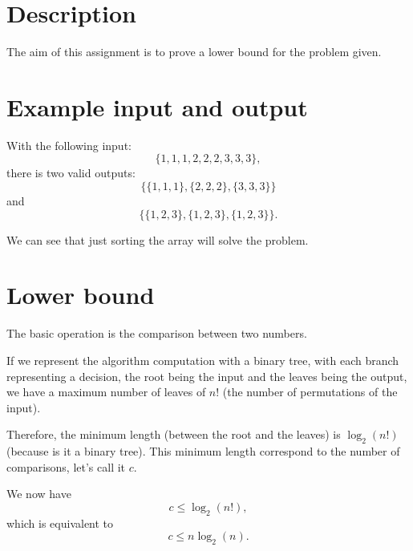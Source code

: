 \section{Description}
    The aim of this assignment is to prove a lower bound for the problem given.

\section{Example input and output} 
    With the following input: \[ \{1,1,1,2,2,2,3,3,3\} ,\] there is two valid outputs: \[ \{\{1,1,1\},\{2,2,2\},\{3,3,3\}\}\] and \[ \{\{1,2,3\},\{1,2,3\},\{1,2,3\}\}.\]

    We can see that just sorting the array will solve the problem.

\section{Lower bound}
    The basic operation is the comparison between two numbers.

    If we represent the algorithm computation with a binary tree, with each branch representing a decision, the root being the input and the leaves being the output, we have a maximum number of leaves of $n!$ (the number of permutations of the input).

    Therefore, the minimum length (between the root and the leaves) is $\log_2(n!)$ (because is it a binary tree). This minimum length correspond to the number of comparisons, let's call it $c$.

    We now have \[ c \leq \log_2(n!)  ,\] which is equivalent to \[ c \leq n\log_2(n).\]
